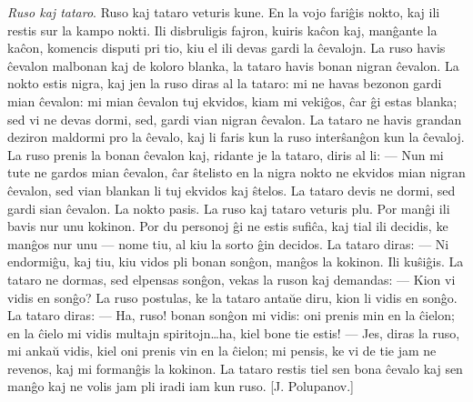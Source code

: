 \emph{Ruso kaj tataro}. Ruso kaj tataro veturis kune. En la vojo
fari\^gis nokto, kaj ili restis sur la kampo nokti. Ili disbruligis
fajron, kuiris ka\^con kaj, man\^gante la ka\^con, komencis disputi
pri tio, kiu el ili devas gardi la \^cevalojn. La ruso havis
\^cevalon malbonan kaj de koloro blanka, la tataro havis bonan
nigran \^cevalon. La nokto estis nigra, kaj jen la ruso diras al la
tataro: mi ne havas bezonon gardi mian \^cevalon: mi mian \^cevalon
tuj ekvidos, kiam mi veki\^gos, \^car \^gi estas blanka; sed vi ne
devas dormi, sed, gardi vian nigran \^cevalon. La tataro ne havis
grandan deziron maldormi pro la \^cevalo, kaj li faris kun la ruso
inter\^san\^gon kun la \^cevaloj. La ruso prenis la bonan \^cevalon
kaj, ridante je la tataro, diris al li: --- Nun mi tute ne gardos
mian \^cevalon, \^car \^stelisto en la nigra nokto ne ekvidos mian
nigran \^cevalon, sed vian blankan li tuj ekvidos kaj \^stelos. La
tataro devis ne dormi, sed gardi sian \^cevalon. La nokto pasis. La
ruso kaj tataro veturis plu. Por man\^gi ili bavis nur unu kokinon.
Por du personoj \^gi ne estis sufi\^ca, kaj tial ili decidis, ke
man\^gos nur unu --- nome tiu, al kiu la sorto \^gin decidos. La
tataro diras: --- Ni endormi\^gu, kaj tiu, kiu vidos pli bonan
son\^gon, man\^gos la kokinon. Ili ku\^si\^gis. La tataro ne dormas,
sed elpensas son\^gon, vekas la ruson kaj demandas: --- Kion vi
vidis en son\^go? La ruso postulas, ke la tataro anta\u ue diru,
kion li vidis en son\^go. La tataro diras: --- Ha, ruso! bonan
son\^gon mi vidis: oni prenis min en la \^cielon; en la \^cielo mi
vidis multajn spiritojn\dots ha, kiel bone tie estis! --- Jes, diras
la ruso, mi anka\u u vidis, kiel oni prenis vin en la \^cielon; mi
pensis, ke vi de tie jam ne revenos, kaj mi forman\^gis la kokinon.
La tataro restis tiel sen bona \^cevalo kaj sen man\^go kaj ne volis
jam pli iradi iam kun ruso. [J. Polupanov.]

